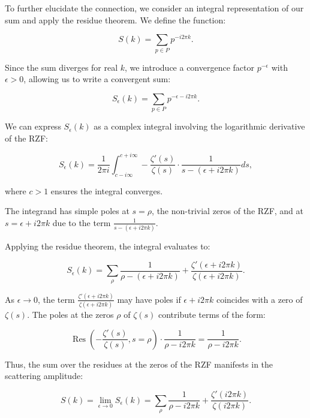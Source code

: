 \documentclass[11pt, oneside]{article}
\begin{document}
To further elucidate the connection, we consider an integral representation of our sum and apply the residue theorem. We define the function:

\begin{equation}
S(k) = \sum_{p \in P} p^{-i 2\pi k}.
\end{equation}

Since the sum diverges for real $k$, we introduce a convergence factor $p^{-\epsilon}$ with $\epsilon > 0$, allowing us to write a convergent sum:

\begin{equation}
S_\epsilon(k) = \sum_{p \in P} p^{- \epsilon - i 2\pi k}.
\end{equation}

We can express $S_\epsilon(k)$ as a complex integral involving the logarithmic derivative of the RZF:

\begin{equation}
S_\epsilon(k) = \frac{1}{2\pi i} \int_{c - i \infty}^{c + i \infty} -\frac{\zeta'(s)}{\zeta(s)} \cdot \frac{1}{s - (\epsilon + i 2\pi k)} ds,
\end{equation}

where $c > 1$ ensures the integral converges.

The integrand has simple poles at $s = \rho$, the non-trivial zeros of the RZF, and at $s = \epsilon + i 2\pi k$ due to the term $\frac{1}{s - (\epsilon + i 2\pi k)}$.

Applying the residue theorem, the integral evaluates to:

\begin{equation}
S_\epsilon(k) = \sum_{\rho} \frac{1}{\rho - (\epsilon + i 2\pi k)} + \frac{\zeta'(\epsilon + i 2\pi k)}{\zeta(\epsilon + i 2\pi k)}.
\end{equation}

As $\epsilon \to 0$, the term $\frac{\zeta'(\epsilon + i 2\pi k)}{\zeta(\epsilon + i 2\pi k)}$ may have poles if $\epsilon + i 2\pi k$ coincides with a zero of $\zeta(s)$. The poles at the zeros $\rho$ of $\zeta(s)$ contribute terms of the form:

\begin{equation}
\operatorname{Res}\left(-\frac{\zeta'(s)}{\zeta(s)}, s = \rho\right) \cdot \frac{1}{\rho - i 2\pi k} = \frac{1}{\rho - i 2\pi k}.
\end{equation}

Thus, the sum over the residues at the zeros of the RZF manifests in the scattering amplitude:

\begin{equation}
S(k) = \lim_{\epsilon \to 0} S_\epsilon(k) = \sum_{\rho} \frac{1}{\rho - i 2\pi k} + \frac{\zeta'(i 2\pi k)}{\zeta(i 2\pi k)}.
\end{equation}
\end{document}
